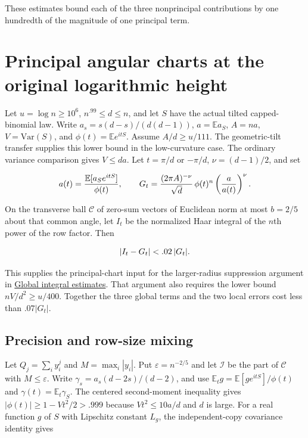 \documentclass[11pt]{article}
\begin{document}
These estimates bound each of the three nonprincipal contributions by one hundredth of the magnitude of one principal term.

\section{Principal angular charts at the original logarithmic height}

Let $u=\log n\ge10^6$, $n^{.99}\le d\le n$, and let $S$ have
the actual tilted capped-binomial law. Write $a_s=s(d-s)/(d(d-1))$,
$a=\mathbb E a_S$, $A=na$, $V=\mathrm{Var}(S)$, and
$\phi(t)=\mathbb E e^{itS}$. Assume $A/d\ge u/111$.
The geometric-tilt transfer supplies this lower bound in the low-curvature
case. The ordinary variance comparison gives $V\le da$.
Let $t=\pi/d$ or $-\pi/d$, $\nu=(d-1)/2$, and set

\[
a(t)=\frac{\mathbb E[a_S e^{itS}]}{\phi(t)},\qquad
G_t=\frac{(2\pi A)^{-\nu}}{\sqrt d}\thinspace{}
       \phi(t)^n\left(\frac{a}{a(t)}\right)^\nu .
\]

On the transverse ball $\mathcal C$ of zero-sum vectors of Euclidean
norm at most $b=2/5$ about that common angle, let $I_t$ be the
normalized Haar integral of the $n$th power of the row factor.
Then

\[
|I_t-G_t|<.02\thinspace{}|G_t|.
\]

This supplies the principal-chart input for the larger-radius
suppression argument in
\href{https://github.com/ProgramComputer/open-math-research/blob/main/topics/balanced-arrays/effective-sublinear/angular-mass-dominance.md\#larger-radius-global-version-at-the-original-row-cutoff}{Global integral estimates}.
That argument also requires the lower bound $nV/d^2\ge u/400$.
Together the three global terms and the two local errors cost
less than $.07|G_t|$.

\subsection{Precision and row-size mixing}

Let $Q_j=\sum_i y_i^j$ and $M=\max_i|y_i|$. Put
$\varepsilon=n^{-2/5}$ and let $\mathcal I$ be the part of
$\mathcal C$ with $M\le\varepsilon$. Write
$\gamma_s=a_s(d-2s)/(d-2)$, and use
$\mathbb E_t g=\mathbb E[g e^{itS}]/\phi(t)$ and
$\gamma(t)=\mathbb E_t\gamma_S$. The centered second-moment
inequality gives $|\phi(t)|\ge1-Vt^2/2>.999$ because
$Vt^2\le10 a/d$ and $d$ is large. For a real function $g$ of
$S$ with Lipschitz constant $L_g$, the independent-copy covariance
identity gives
\end{document}
